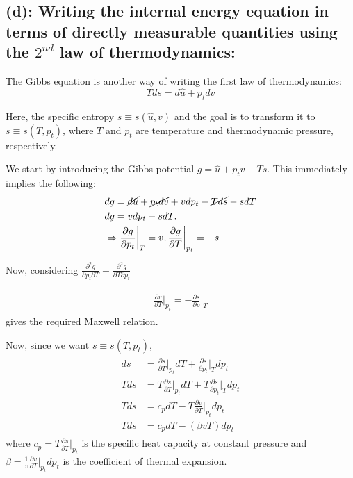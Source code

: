 \documentclass{article}
\begin{document}
\subsection*{(d): Writing the internal energy equation in terms of directly measurable quantities using the $2^{nd}$ law of thermodynamics:}
The Gibbs equation is another way of writing the first law of thermodynamics:
\begin{equation}\label{eq:gibbs}
 Tds = d\hat{u} + p_{t} dv
\end{equation}

Here, the specific entropy $s \equiv s(\hat{u}, v) $ and the goal is to transform it to $s \equiv s(T, p_{t})$, where $T$ and $p_{t}$ are temperature and thermodynamic pressure, respectively.

We start by introducing the Gibbs potential $g = \hat{u} + p_{t}v - Ts$. This immediately implies the following:
\begin{align}
 \begin{split}
  & dg = \cancel{d\hat{u}} + \cancel{p_{t}dv} + vdp_{t} - \cancel{Tds} - sdT \\
  & dg = vdp_{t} - sdT. \\
  & \Rightarrow \frac{\partial g}{\partial p_{t}}\bigg|_{T} = v, \frac{\partial g}{\partial T}\bigg|_{p_{t}} = -s
 \end{split}
\end{align}

Now, considering $\frac{\partial^{2}g}{\partial p_{t} \partial T} = \frac{\partial^{2}g}{\partial T \partial p_{t}}$

\begin{align}\label{eq:maxwell_relation}
 \begin{split}
  \frac{\partial v}{\partial T}\bigg|_{p_{t}} = - \frac{\partial s}{\partial p}\bigg|_{T} 
 \end{split}
\end{align}
gives the required Maxwell relation.

Now, since we want $s \equiv s(T, p_{t})$,
\begin{align}
 \begin{split}
  ds &= \frac{\partial s}{\partial T}\bigg|_{p_{t}} dT+ \frac{\partial s}{\partial p_{t}}\bigg|_{T} dp_{t}\\
  T ds &= T\frac{\partial s}{\partial T}\bigg|_{p_{t}} dT+ T\frac{\partial s}{\partial p_{t}}\bigg|_{T} dp_{t}\\
  T ds &= c_{p} dT - T  \frac{\partial v}{\partial T}\bigg|_{p_{t}} dp_{t}\\
  Tds &= c_{p} dT - (\beta v T)dp_{t}
 \end{split}
\end{align}
where $c_{p} = T\frac{\partial s}{\partial T}\bigg|_{p_{t}}$ is the specific heat capacity at constant pressure and $\beta = \frac{1}{v}\frac{\partial v}{\partial T}\bigg|_{p_{t}} dp_{t}$ is the coefficient of thermal expansion.
\end{document}
